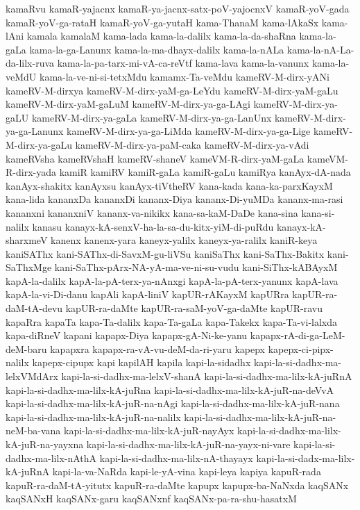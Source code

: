 {kamaRvu
kamaR-yajacnx
kamaR-ya-jacnx-satx-poV-yajocnxV
kamaR-yoV-gada
kamaR-yoV-ga-rataH
kamaR-yoV-ga-yutaH
kama-ThanaM
kama-lAkaSx
kama-lAni
kamala
kamalaM
kama-lada
kama-la-dalilx
kama-la-da-shaRna
kama-la-gaLa
kama-la-ga-Lanunx
kama-la-ma-dhayx-dalilx
kama-la-nALa
kama-la-nA-La-da-lilx-ruva
kama-la-pa-tarx-mi-vA-ca-reVtf
kama-lava
kama-la-vanunx
kama-la-veMdU
kama-la-ve-ni-si-tetxMdu
kamamx-Ta-veMdu
kameRV-M-dirx-yANi
kameRV-M-dirxya
kameRV-M-dirx-yaM-ga-LeYdu
kameRV-M-dirx-yaM-gaLu
kameRV-M-dirx-yaM-gaLuM
kameRV-M-dirx-ya-ga-LAgi
kameRV-M-dirx-ya-gaLU
kameRV-M-dirx-ya-gaLa
kameRV-M-dirx-ya-ga-LanUnx
kameRV-M-dirx-ya-ga-Lanunx
kameRV-M-dirx-ya-ga-LiMda
kameRV-M-dirx-ya-ga-Lige
kameRV-M-dirx-ya-gaLu
kameRV-M-dirx-ya-paM-caka
kameRV-M-dirx-ya-vAdi
kameRVsha
kameRVshaH
kameRV-shaneV
kameVM-R-dirx-yaM-gaLa
kameVM-R-dirx-yada
kamiR
kamiRV
kamiR-gaLa
kamiR-gaLu
kamiRya
kanAyx-dA-nada
kanAyx-shakitx
kanAyxsu
kanAyx-tiVtheRV
kana-kada
kana-ka-parxKayxM
kana-lida
kananxDa
kananxDi
kananx-Diya
kananx-Di-yuMDa
kananx-ma-rasi
kananxni
kananxniV
kananx-va-nikikx
kana-sa-kaM-DaDe
kana-sina
kana-si-nalilx
kanasu
kanayx-kA-senxV-ha-la-sa-du-kitx-yiM-di-puRdu
kanayx-kA-sharxmeV
kanenx
kanenx-yara
kaneyx-yalilx
kaneyx-ya-ralilx
kaniR-keya
kaniSAThx
kani-SAThx-di-SavxM-gu-liVSu
kaniSaThx
kani-SaThx-Bakitx
kani-SaThxMge
kani-SaThx-pArx-NA-yA-ma-ve-ni-su-vudu
kani-SiThx-kABAyxM
kapA-la-dalilx
kapA-la-pA-terx-ya-nAnxgi
kapA-la-pA-terx-yanunx
kapA-lava
kapA-la-vi-Di-danu
kapAli
kapA-liniV
kapUR-rAKayxM
kapURra
kapUR-ra-daM-tA-devu
kapUR-ra-daMte
kapUR-ra-saM-yoV-ga-daMte
kapUR-ravu
kapaRra
kapaTa
kapa-Ta-dalilx
kapa-Ta-gaLa
kapa-Takekx
kapa-Ta-vi-lalxda
kapa-diRneV
kapani
kapapx-Diya
kapapx-gA-Ni-ke-yanu
kapapx-rA-di-ga-LeM-deM-baru
kapapxra
kapapx-ra-vA-vu-deM-da-ri-yaru
kapepx
kapepx-ci-pipx-nalilx
kapepx-cipupx
kapi
kapilAH
kapila
kapi-la-sidadhx
kapi-la-si-dadhx-ma-lelxVMdArx
kapi-la-si-dadhx-ma-lelxV-shanA
kapi-la-si-dadhx-ma-lilx-kA-juRnA
kapi-la-si-dadhx-ma-lilx-kA-juRna
kapi-la-si-dadhx-ma-lilx-kA-juR-na-deVvA
kapi-la-si-dadhx-ma-lilx-kA-juR-na-nAgi
kapi-la-si-dadhx-ma-lilx-kA-juR-nana
kapi-la-si-dadhx-ma-lilx-kA-juR-na-nalilx
kapi-la-si-dadhx-ma-lilx-kA-juR-na-neM-ba-vana
kapi-la-si-dadhx-ma-lilx-kA-juR-nayAyx
kapi-la-si-dadhx-ma-lilx-kA-juR-na-yayxna
kapi-la-si-dadhx-ma-lilx-kA-juR-na-yayx-ni-vare
kapi-la-si-dadhx-ma-lilx-nAthA
kapi-la-si-dadhx-ma-lilx-nA-thayayx
kapi-la-si-dadx-ma-lilx-kA-juRnA
kapi-la-va-NaRda
kapi-le-yA-vina
kapi-leya
kapiya
kapuR-rada
kapuR-ra-daM-tA-yitutx
kapuR-ra-daMte
kapupx
kapupx-ba-NaNxda
kaqSANx
kaqSANxH
kaqSANx-garu
kaqSANxnf
kaqSANx-pa-ra-shu-hasatxM
}
